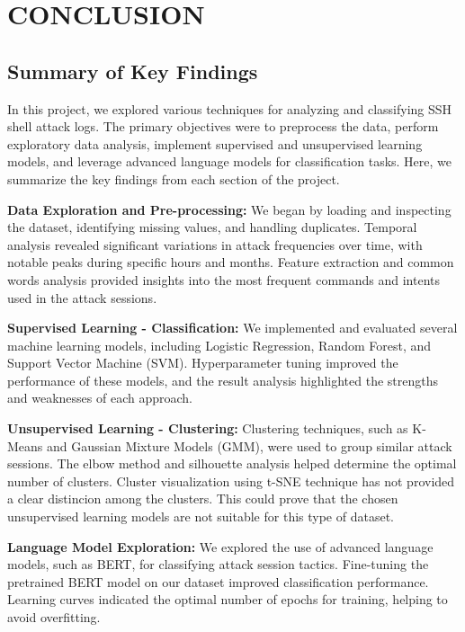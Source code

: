 

\section{CONCLUSION}


    \subsection{Summary of Key Findings}
    
        In this project, we explored various techniques for analyzing and classifying SSH shell attack logs. The primary objectives were to preprocess the data, perform exploratory data analysis, implement supervised and unsupervised learning models, and leverage advanced language models for classification tasks. Here, we summarize the key findings from each section of the project.

        \textbf{Data Exploration and Pre-processing:} We began by loading and inspecting the dataset, identifying missing values, and handling duplicates. Temporal analysis revealed significant variations in attack frequencies over time, with notable peaks during specific hours and months. Feature extraction and common words analysis provided insights into the most frequent commands and intents used in the attack sessions.

        \textbf{Supervised Learning - Classification:} We implemented and evaluated several machine learning models, including Logistic Regression, Random Forest, and Support Vector Machine (SVM). Hyperparameter tuning improved the performance of these models, and the result analysis highlighted the strengths and weaknesses of each approach.

        \textbf{Unsupervised Learning - Clustering:} Clustering techniques, such as K-Means and Gaussian Mixture Models (GMM), were used to group similar attack sessions. The elbow method and silhouette analysis helped determine the optimal number of clusters. Cluster visualization using t-SNE technique has not provided a clear distincion among the clusters. This could prove that the chosen unsupervised learning models are not suitable for this type of dataset. 

        \textbf{Language Model Exploration:} We explored the use of advanced language models, such as BERT, for classifying attack session tactics. Fine-tuning the pretrained BERT model on our dataset improved classification \clearpage performance. Learning curves indicated the optimal number of epochs for training, helping to avoid overfitting. 

